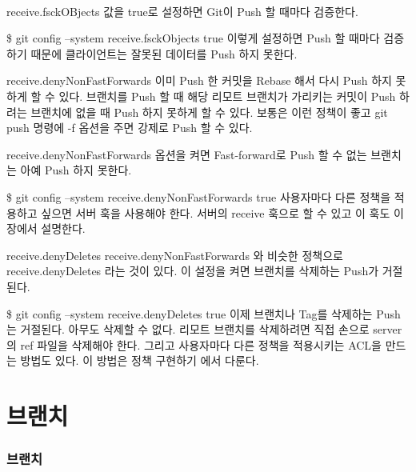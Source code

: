 \documentclass[12pt, a4paper, oneside]{book}
\let\stdsection\section
\renewcommand\section{\newpage\stdsection}
\begin{document}
\paragraph{}
receive.fsckOBjects 값을 true로 설정하면 Git이 Push 할 때마다 검증한다.

\$ git config --system receive.fsckObjects true
이렇게 설정하면 Push 할 때마다 검증하기 때문에 클라이언트는 잘못된 데이터를 Push 하지 못한다.

receive.denyNonFastForwards
이미 Push 한 커밋을 Rebase 해서 다시 Push 하지 못하게 할 수 있다. 브랜치를 Push 할 때 해당 리모트 브랜치가 가리키는 커밋이 Push 하려는 브랜치에 없을 때 Push 하지 못하게 할 수 있다. 보통은 이런 정책이 좋고 git push 명령에 -f 옵션을 주면 강제로 Push 할 수 있다.

receive.denyNonFastForwards 옵션을 켜면 Fast-forward로 Push 할 수 없는 브랜치는 아예 Push 하지 못한다.

\$ git config --system receive.denyNonFastForwards true
사용자마다 다른 정책을 적용하고 싶으면 서버 훅을 사용해야 한다. 서버의 receive 훅으로 할 수 있고 이 훅도 이 장에서 설명한다.

receive.denyDeletes
receive.denyNonFastForwards 와 비슷한 정책으로 receive.denyDeletes 라는 것이 있다. 이 설정을 켜면 브랜치를 삭제하는 Push가 거절된다.

\$ git config --system receive.denyDeletes true
이제 브랜치나 Tag를 삭제하는 Push는 거절된다. 아무도 삭제할 수 없다. 리모트 브랜치를 삭제하려면 직접 손으로 server의 ref 파일을 삭제해야 한다. 그리고 사용자마다 다른 정책을 적용시키는 ACL을 만드는 방법도 있다. 이 방법은 정책 구현하기 에서 다룬다.




	\part 	{브랜치}

	\noptcrule
	\parttoc	
	\minitoc
				


%										
	\section{브랜치}
\end{document}
